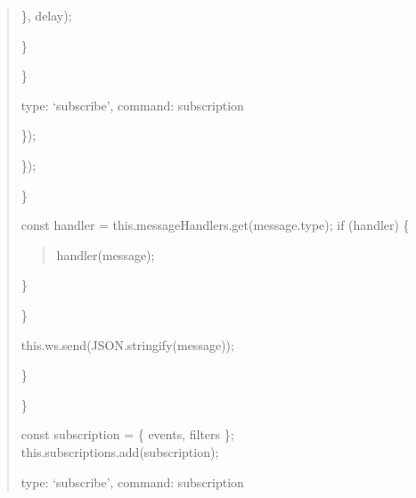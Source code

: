 \documentclass[letterpaper,10pt,english]{sphinxmanual}
\begin{document}
\begin{quote}
\begin{description}
\begin{description}
\begin{description}
\end{description}

\sphinxAtStartPar
\}, delay);

\end{description}

\sphinxAtStartPar
\}

\end{description}

\sphinxAtStartPar
\}
\begin{description}
\begin{description}
\begin{description}
\sphinxAtStartPar
type: ‘subscribe’,
command: subscription

\end{description}

\sphinxAtStartPar
\});

\end{description}

\sphinxAtStartPar
\});

\end{description}

\sphinxAtStartPar
\}
\begin{description}
\sphinxAtStartPar
const handler = this.messageHandlers.get(message.type);
if (handler) \{
\begin{quote}

\sphinxAtStartPar
handler(message);
\end{quote}

\sphinxAtStartPar
\}

\end{description}

\sphinxAtStartPar
\}
\begin{description}
\begin{description}
\sphinxAtStartPar
this.ws.send(JSON.stringify(message));

\end{description}

\sphinxAtStartPar
\}

\end{description}

\sphinxAtStartPar
\}
\begin{description}
\sphinxAtStartPar
const subscription = \{ events, filters \};
this.subscriptions.add(subscription);
\begin{description}
\sphinxAtStartPar
type: ‘subscribe’,
command: subscription


\end{description}
\end{description}
\end{quote}
\end{document}
